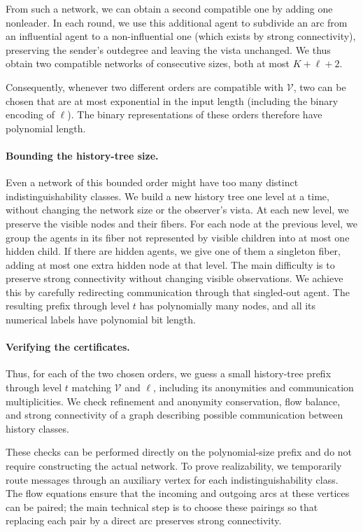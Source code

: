 \documentclass[11pt]{article}
\begin{document}
From such a network, we can obtain a second compatible one by adding one nonleader. In each round, we use this additional agent to subdivide an arc from an influential agent to a non-influential one (which exists by strong connectivity), preserving the sender's outdegree and leaving the vista unchanged. We thus obtain two compatible networks of
consecutive sizes, both at most $K+\ell+2$.

Consequently, whenever two different orders are compatible with \(\mathcal V\), two can be chosen that are at most exponential in the input length (including the binary encoding of \(\ell\)). The binary representations of these orders therefore have polynomial length.

\paragraph{Bounding the history-tree size.}
Even a network of this bounded order might have too many distinct indistinguishability classes. We build a new history tree one level at a time, without changing the network size or the observer's vista. At each new level, we preserve the visible nodes and their fibers. For each node at the previous level, we group the agents in its fiber not represented by visible children into at most one hidden child. If there are hidden agents, we give one of them a singleton fiber, adding at most one extra hidden node at that level. The main difficulty is to preserve strong connectivity without changing visible observations. We achieve this by carefully redirecting communication through that singled-out agent. The resulting prefix through level $t$ has polynomially many nodes, and all its numerical labels have polynomial bit length.

\paragraph{Verifying the certificates.}
Thus, for each of the two chosen orders, we guess a small history-tree prefix through level $t$ matching $\mathcal V$ and $\ell$, including its anonymities and communication multiplicities. We check refinement and anonymity conservation, flow balance, and strong connectivity of a graph describing possible communication between history classes.

These checks can be performed directly on the polynomial-size prefix and do not require constructing the actual network. To prove realizability, we temporarily route messages through an auxiliary vertex for each indistinguishability class. The flow equations ensure that the incoming and outgoing arcs at these vertices can be paired; the main technical step is to choose these pairings so that replacing each pair by a direct arc preserves strong connectivity.
\end{document}
